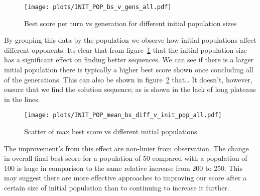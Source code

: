 \begin{figure}[ht] 
    \texttt{[image: plots/INIT\_POP\_bs\_v\_gens\_all.pdf]}
    \caption{Best score per turn vs generation for different initial population sizes}\label{fig:INIT-POP-bs-v-gens-all}
\end{figure}

By grouping this data by the population we observe how initial populations affect different opponents.
Its clear that from figure~\ref{fig:INIT-POP-bs-v-gens-all} that the initial population size has a significant effect on finding better sequences.
We can see if there is a larger initial population there is typically a higher best score shown once concluding all of the generations.
This can also be shown in figure~\ref{fig:INIT-POP-mean-bs-v-init-pop-all} that\ldots
It doesn't, however, ensure that we find the solution sequence;
as is shown in the lack of long plateaus in the lines.\\

\begin{figure}[ht] 
    \texttt{[image: plots/INIT\_POP\_mean\_bs\_diff\_v\_init\_pop\_all.pdf]}
    \caption{Scatter of max best score vs different initial populations}\label{fig:INIT-POP-mean-bs-v-init-pop-all}
\end{figure}

The improvement's from this effect are non-linier from observation.
The change in overall final best score for a population of 50 compared with a population of 100 is huge in comparison to the same relative increase from 200 to 250.
This may suggest there are more effective approaches to improving our score after a certain size of initial population than to continuing to increase it further. \\



